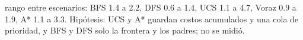 {rango entre escenarios: BFS 1.4 a 2.2, DFS 0.6 a 1.4, UCS 1.1 a 4.7, Voraz 0.9 a 1.9, A* 1.1 a 3.3.}
{Hipótesis: UCS y A* guardan costos acumulados y una cola de prioridad, y BFS y DFS solo la frontera y los padres; no se midió.}

